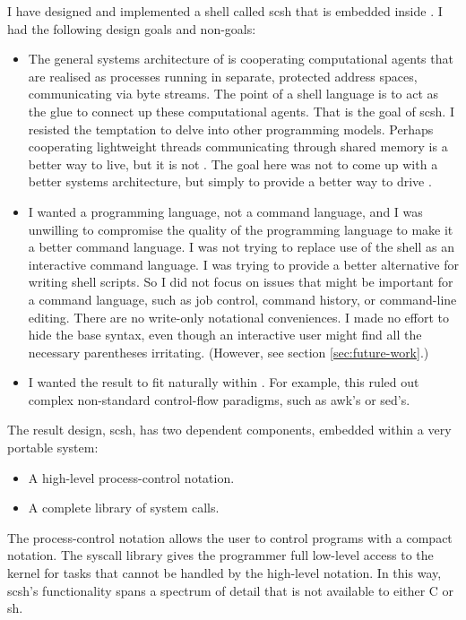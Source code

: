I have designed and implemented a {\Unix} shell called scsh that is
embedded inside {\Scheme}.
I had the following design goals and non-goals:
\begin{itemize}
\item  
  The general systems architecture of {\Unix} is cooperating computational
  agents that are realised as processes running in separate, protected address
  spaces, communicating via byte streams.
  The point of a shell language is to act as the glue to connect up these
  computational agents.
  That is the goal of scsh.
  I resisted the temptation to delve into other programming models.
  Perhaps cooperating lightweight threads communicating through shared memory
  is a better way to live, but it is not {\Unix}.
  The goal here was not to come up with a better systems architecture, but
  simply to provide a better way to drive {\Unix}.

\item 
  I wanted a programming language, not a command language, and I was
  unwilling to compromise the quality of the programming language to
  make it a better command language. I was not trying to replace use of
  the shell as an interactive command language. I was trying to provide
  a better alternative for writing shell scripts. So I did not focus
  on issues that might be important for a command language, such as job
  control, command history, or command-line editing. There are no write-only
  notational conveniences. I made no effort to hide the
  base {\Scheme} syntax, even though an interactive user might find all
  the necessary parentheses irritating.  
  (However, see section \ref{sec:future-work}.)

\item 
  I wanted the result to fit naturally within {\Scheme}. For example, 
  this ruled out complex non-standard control-flow paradigms, 
  such as awk's or sed's.
\end{itemize}

The result design, scsh, has two dependent components, embedded
within a very portable {\Scheme} system:
\begin{itemize}
\item A high-level process-control notation.
\item A complete library of {\Unix} system calls.
\end{itemize}
The process-control notation allows the user to control {\Unix} programs
with a compact notation.
The syscall library gives the programmer full low-level access to the kernel
for tasks that cannot be handled by the high-level notation.
In this way, scsh's functionality spans a spectrum of detail that is
not available to either C or sh.


